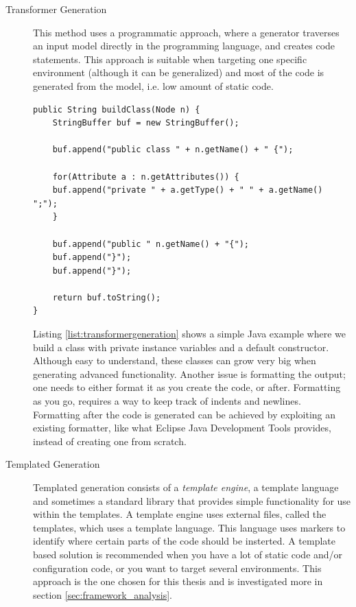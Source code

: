 \begin{description}
  \item[Transformer Generation]
  This method uses a programmatic approach, where a generator traverses an input model directly in the programming language, and creates code statements. This approach is suitable when targeting one specific environment (although it can be generalized) and most of the code is generated from the model, i.e. low amount of static code.
\lstset{language=Java,caption=Example showing a Java method building code.,label=list:transformergeneration,captionpos=b}
\begin{lstlisting}[showstringspaces=false]
public String buildClass(Node n) {
    StringBuffer buf = new StringBuffer();
    
    buf.append("public class " + n.getName() + " {");
    
    for(Attribute a : n.getAttributes()) {
	buf.append("private " + a.getType() + " " + a.getName() ";");
    }
    
    buf.append("public " n.getName() + "{");
    buf.append("}");
    buf.append("}");
    
    return buf.toString();
}
\end{lstlisting}
  Listing \ref{list:transformergeneration} shows a simple Java example where we build a class with private instance variables and a default constructor. Although easy to understand, these classes can grow very big when generating advanced functionality. Another issue is formatting the output; one needs to either format it as you create the code, or after. Formatting as you go, requires a way to keep track of indents and newlines. Formatting after the code is generated can be achieved by exploiting an existing formatter, like what Eclipse Java Development Tools provides, instead of creating one from scratch.
  \item[Templated Generation]
  Templated generation consists of a \emph{template engine}, a template language and sometimes a standard library that provides simple functionality for use within the templates. A template engine uses external files, called the templates, which uses a template language. This language uses markers to identify where certain parts of the code should be insterted. A template based solution is recommended when you have a lot of static code and/or configuration code, or you want to target several environments. This approach is the one chosen for this thesis and is investigated more in section \ref{sec:framework_analysis}.
\end{description}

